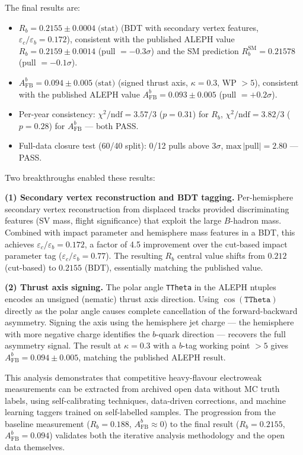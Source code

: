 \documentclass[11pt,a4paper]{article}
\begin{document}
The final results are:
\begin{itemize}
\item $R_b = 0.2155 \pm 0.0004\;\text{(stat)}$
  (BDT with secondary vertex features,
  $\varepsilon_c/\varepsilon_b = 0.172$),
  consistent with the published ALEPH value
  $R_b = 0.2159 \pm 0.0014$ (pull $= -0.3\sigma$) and the SM
  prediction $R_b^\text{SM} = 0.21578$ (pull $= -0.1\sigma$).
\item $A_\text{FB}^b = 0.094 \pm 0.005\;\text{(stat)}$
  (signed thrust axis, $\kappa = 0.3$, WP $> 5$),
  consistent with the published ALEPH value
  $A_\text{FB}^b = 0.093 \pm 0.005$ (pull $= +0.2\sigma$).
\item Per-year consistency:
  $\chi^2/\text{ndf} = 3.57/3$ ($p = 0.31$) for $R_b$,
  $\chi^2/\text{ndf} = 3.82/3$ ($p = 0.28$) for $A_\text{FB}^b$
  --- both PASS.
\item Full-data closure test (60/40 split): 0/12 pulls above
  $3\sigma$, $\text{max}\,|\text{pull}| = 2.80$ --- PASS.
\end{itemize}

Two breakthroughs enabled these results:

\textbf{(1) Secondary vertex reconstruction and BDT tagging.}
Per-hemisphere secondary vertex reconstruction from displaced
tracks provided discriminating features (SV mass, flight
significance) that exploit the large $B$-hadron mass.
Combined with impact parameter and hemisphere mass features in a
BDT, this achieves $\varepsilon_c/\varepsilon_b = 0.172$, a
factor of 4.5 improvement over the cut-based impact parameter tag
($\varepsilon_c/\varepsilon_b = 0.77$).
The resulting $R_b$ central value shifts from $0.212$ (cut-based)
to $0.2155$ (BDT), essentially matching the published value.

\textbf{(2) Thrust axis signing.}
The polar angle \texttt{TTheta} in the ALEPH ntuples encodes an
unsigned (nematic) thrust axis direction.
Using $\cos(\texttt{TTheta})$ directly as the polar angle causes
complete cancellation of the forward-backward asymmetry.
Signing the axis using the hemisphere jet charge --- the hemisphere
with more negative charge identifies the $b$-quark direction ---
recovers the full asymmetry signal.
The result at $\kappa = 0.3$ with a $b$-tag working point
$> 5$ gives $A_\text{FB}^b = 0.094 \pm 0.005$, matching the
published ALEPH result.

This analysis demonstrates that competitive heavy-flavour
electroweak measurements can be extracted from archived open data
without MC truth labels, using self-calibrating techniques,
data-driven corrections, and machine learning taggers trained on
self-labelled samples.
The progression from the baseline measurement
($R_b = 0.188$, $A_\text{FB}^b \approx 0$) to the final result
($R_b = 0.2155$, $A_\text{FB}^b = 0.094$) validates both the
iterative analysis methodology and the open data themselves.
\end{document}

